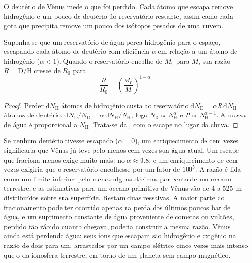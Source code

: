 O deutério de Vênus mede o que foi perdido. Cada átomo que escapa
remove hidrogênio e um pouco de deutério do reservatório restante, assim como
cada gota que precipita remove um pouco dos isótopos pesados de uma
nuvem.

\begin{proposition}\label{prop:b3:planetary-atmospheres:dh}
Suponha-se que um reservatório de água perca hidrogênio para o espaço, escapando cada átomo de deutério
com eficiência $\alpha$ em relação a um átomo de hidrogênio
($\alpha < 1$). Quando o reservatório encolhe de $M_0$ para $M$, sua razão
$R = \mathrm{D}/\mathrm{H}$ cresce de $R_0$ para
\[
\frac R{R_0} = \left(\frac{M_0}M\right)^{1-\alpha}.
\]
\end{proposition}

\begin{proof}
Perder $\mathrm dN_\mathrm H$ átomos de hidrogênio custa ao reservatório
$\mathrm dN_\mathrm D = \alpha R\,\mathrm dN_\mathrm H$ átomos de deutério:
$\mathrm dN_\mathrm D/N_\mathrm D = \alpha\,\mathrm dN_\mathrm H/
N_\mathrm H$, logo $N_\mathrm D \propto N_\mathrm H^\alpha$ e $R \propto
N_\mathrm H^{\alpha - 1}$. A massa de água é proporcional a
$N_\mathrm H$. Trata-se da , com o escape no lugar da
chuva.
\end{proof}

Se nenhum deutério tivesse escapado ($\alpha = 0$), um enriquecimento de cem vezes
significaria que Vênus já teve pelo menos cem vezes sua água atual.
Um escape que fraciona menos exige muito mais: no 
$\alpha \approx 0.8$, e um enriquecimento de cem vezes exigiria
que o reservatório encolhesse por um fator de $100^5$. A razão é lida como um
limite inferior: pelo menos alguns décimos por cento de um oceano terrestre,
e as estimativas para um oceano primitivo de Vênus vão de 4 a \qty{525}{m} distribuídos
sobre sua superfície. Restam duas ressalvas. A maior parte do fracionamento pode ter
ocorrido apenas na perda dos últimos poucos bar de água, e um suprimento constante
de água proveniente de cometas ou vulcões, perdido tão rápido quanto chegava, poderia
construir a mesma razão. Vênus ainda está perdendo água: seus íons que escapam são
hidrogênio e oxigênio na razão de dois para um, arrastados por um campo elétrico
cinco vezes mais intenso que o da ionosfera terrestre, em torno de um
planeta sem campo magnético.

